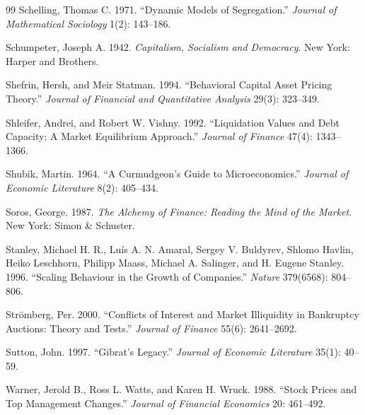 \documentclass[11pt]{article}
\begin{document}
\begin{thebibliography}{99}
Schelling, Thomas C. 1971. ``Dynamic Models of Segregation.''
\textit{Journal of Mathematical Sociology} 1(2): 143--186.

Schumpeter, Joseph A. 1942. \textit{Capitalism, Socialism and
Democracy}. New York: Harper and Brothers.

Shefrin, Hersh, and Meir Statman. 1994. ``Behavioral Capital Asset
Pricing Theory.'' \textit{Journal of Financial and Quantitative
Analysis} 29(3): 323--349.

Shleifer, Andrei, and Robert W. Vishny. 1992. ``Liquidation Values
and Debt Capacity: A Market Equilibrium Approach.''
\textit{Journal of Finance} 47(4): 1343--1366.

Shubik, Martin. 1964. ``A Curmudgeon's Guide to Microeconomics.''
\textit{Journal of Economic Literature} 8(2): 405--434.

Soros, George. 1987. \textit{The Alchemy of Finance: Reading the
Mind of the Market}. New York: Simon \& Schuster.

Stanley, Michael H. R., Luís A. N. Amaral, Sergey V. Buldyrev,
Shlomo Havlin, Heiko Leschhorn, Philipp Maass, Michael A. Salinger,
and H. Eugene Stanley. 1996. ``Scaling Behaviour in the Growth of
Companies.'' \textit{Nature} 379(6568): 804--806.

Strömberg, Per. 2000. ``Conflicts of Interest and Market Illiquidity
in Bankruptcy Auctions: Theory and Tests.''
\textit{Journal of Finance} 55(6): 2641--2692.

Sutton, John. 1997. ``Gibrat's Legacy.''
\textit{Journal of Economic Literature} 35(1): 40--59.

Warner, Jerold B., Ross L. Watts, and Karen H. Wruck. 1988. ``Stock
Prices and Top Management Changes.''
\textit{Journal of Financial Economics} 20: 461--492.

\end{thebibliography}
\end{document}
